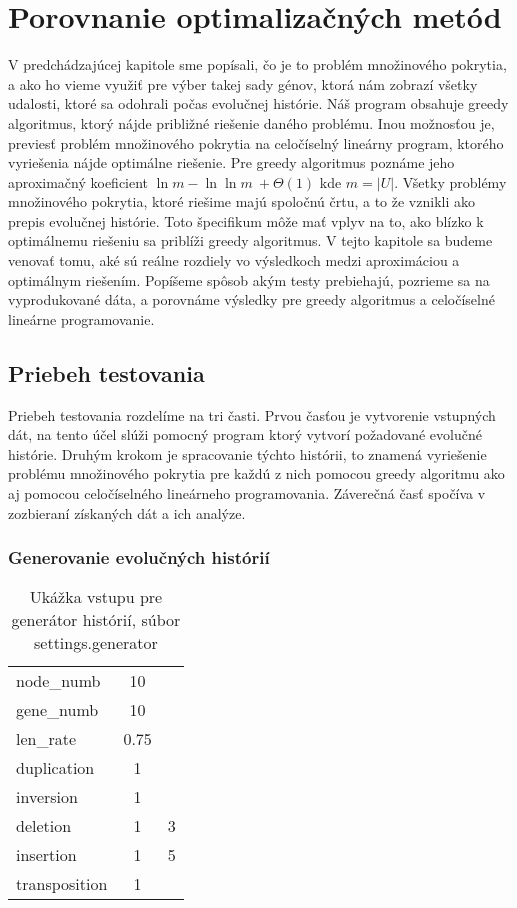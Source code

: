 \chapter{Porovnanie optimalizačných metód}
V predchádzajúcej kapitole sme popísali, čo je to problém množinového pokrytia, a
ako ho vieme využiť pre výber takej sady génov, ktorá nám zobrazí všetky udalosti, ktoré sa odohrali počas evolučnej histórie.
Náš program obsahuje greedy algoritmus, ktorý nájde približné riešenie daného problému.
Inou možnosťou je, previesť problém množinového pokrytia na celočíselný lineárny program, ktorého vyriešenia nájde optimálne riešenie.
Pre greedy algoritmus poznáme jeho aproximačný koeficient \(\ln m - \ln \ln m\ +\Theta(1) \) \cite{Slavik} 
kde \(m = |U|\). 
Všetky problémy množinového pokrytia, ktoré riešime majú spoločnú črtu, a to že vznikli ako prepis evolučnej histórie.
Toto špecifikum môže mať vplyv na to, ako blízko k optimálnemu riešeniu sa priblíži greedy algoritmus.
V tejto kapitole sa budeme venovať tomu, aké sú reálne rozdiely vo výsledkoch medzi aproximáciou a optimálnym riešením.
Popíšeme spôsob akým testy prebiehajú, pozrieme sa na vyprodukované dáta, a porovnáme výsledky pre greedy algoritmus a celočíselné lineárne programovanie.

\section{Priebeh testovania}
Priebeh testovania rozdelíme na tri časti. 
Prvou časťou je vytvorenie vstupných dát, na tento účel slúži pomocný program ktorý vytvorí požadované evolučné histórie.
Druhým krokom je spracovanie týchto histórii, to znamená vyriešenie problému množinového pokrytia pre každú z nich pomocou 
greedy algoritmu ako aj pomocou celočíselného lineárneho programovania. Záverečná časť spočíva v zozbieraní získaných dát a ich analýze.
\subsection{Generovanie evolučných histórií}
\label{sub:generovanie}

\begin{table}[!htb]
\label{tab:generator}
\begin{center}
\begin{tabular}{lcl}
node\_numb & 10 & \\
gene\_numb & 10 & \\
len\_rate & 0.75 & \\
duplication & 1 & \\ 
inversion & 1 & \\ 
deletion & 1 & 3 \\ 
insertion & 1 & 5 \\ 
transposition & 1 & \\
\end{tabular}
\end{center}
\caption{Ukážka vstupu pre generátor histórií, súbor settings.generator}
\end{table}

